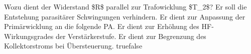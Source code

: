     {Wozu dient der Widerstand \$R\$ parallel zur Trafowicklung \$T\_2\$?}
    {Er soll die Entstehung parasitärer Schwingungen verhindern.}
    {Er dient zur Anpassung der Primärwicklung an die folgende PA.}
    {Er dient zur Erhöhung des HF-Wirkungsgrades der Verstärkerstufe.}
    {Er dient zur Begrenzung des Kollektorstroms bei Übersteuerung.}
    {true}{false}